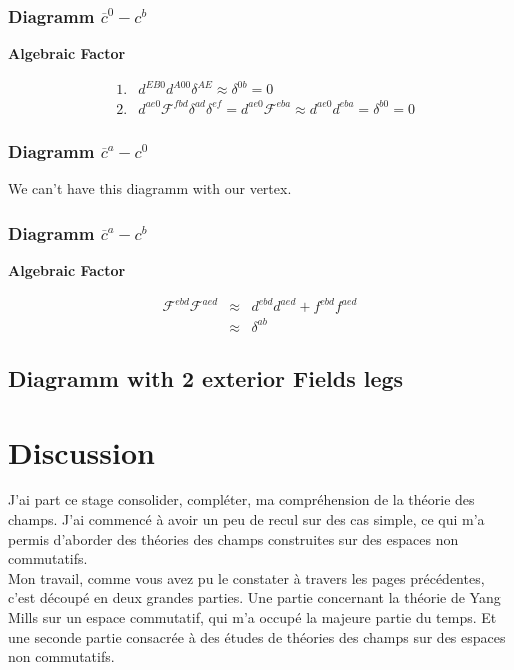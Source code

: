 \documentclass[a4paper,11pt]{article} %
\theoremstyle{plain}
\theoremstyle{definition}
\theoremstyle{remark}
\numberwithin{equation}{section}
\numberwithin{equation}{subsection}
\numberwithin{figure}{section}
\begin{document}
    \subsubsection{Diagramm $\overline{c}^{0} - c^{b}$}

\textbf{Algebraic Factor}

\begin{eqnarray*}
 &1.&  d^{EB0} d^{A00} \delta^{AE} \approx \delta^{0b}  = 0  \\
 &2.&  d^{ae0} \mathcal{F}^{fbd} \delta^{ad} \delta^{ef} = d^{ae0} \mathcal{F}^{eba}  \approx d^{ae0} d^{eba} = \delta^{b0}  =  0
\end{eqnarray*}


    \subsubsection{Diagramm $\overline{c}^{a} - c^{0}$}

We can't have this diagramm with our vertex.


    \subsubsection{Diagramm $\overline{c}^{a} - c^{b}$}

\textbf{Algebraic Factor}

\begin{eqnarray*}
 \mathcal{F}^{ebd} \mathcal{F}^{aed} &\approx& d^{ebd} d^{aed} + f^{ebd} f^{aed} \\
                                     &\approx& \delta^{ab}
\end{eqnarray*}

  \subsection{Diagramm with 2 exterior Fields legs}

\section{Discussion}

J'ai part ce stage consolider, compléter, ma compréhension de la théorie des champs. J'ai commencé à avoir un peu de recul sur des cas simple, ce qui m'a permis d'aborder des théories des champs construites sur des espaces non commutatifs.\\

Mon travail, comme vous avez pu le constater à travers les pages précédentes, c'est découpé en deux grandes parties. Une partie concernant la théorie de Yang Mills sur un espace commutatif, qui m'a occupé la majeure partie du temps. Et une seconde partie consacrée à des études de théories des champs sur des espaces non commutatifs.\\
\end{document}
